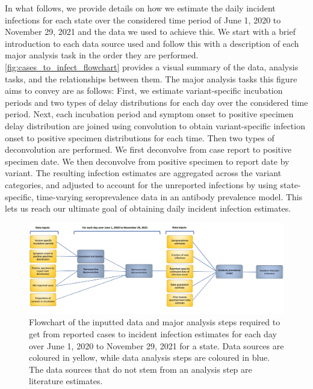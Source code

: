 \documentclass{article}
\begin{document}
In what follows, we provide details on how we estimate the daily incident
infections for each state over the considered time period of June 1, 2020 to
November 29, 2021 and the data we used to achieve this. We start with a brief
introduction to each data source used and follow this with a description of each
major analysis task in the order they are performed.
\autoref{fig:cases_to_infect_flowchart} provides a visual summary of the data,
analysis tasks, and the relationships between them. The major analysis tasks this figure aims to convey are as follows: 
First, we estimate variant-specific incubation periods and two types of delay distributions for each day over the considered time period. Next, each incubation period and symptom onset to positive specimen delay distribution are joined using convolution to obtain variant-specific infection onset to positive specimen distributions for each time. Then two types of deconvolution are performed. We first deconvolve from case report to positive specimen date. We then deconvolve from positive specimen to report date by variant. The resulting infection estimates are aggregated across the variant categories, and adjusted to account for the unreported infections by using state-specific, time-varying seroprevalence data in an antibody prevalence model. This lets us reach our ultimate goal of obtaining daily incident infection estimates.


\begin{figure}[!tb]
\centering
    \includegraphics[width=.99\textwidth]{Reported_cases_to_infect_flowchart.pdf} 
    \caption{Flowchart of the inputted data and major analysis steps required 
    to get from reported cases to incident infection estimates for each day 
    over June 1, 2020 to November 29, 2021 for a state. Data sources are coloured 
    in yellow, while data analysis steps are coloured in blue. The data sources that
    do not stem from an analysis step are literature estimates.}
    \label{fig:cases_to_infect_flowchart}
\end{figure}
\end{document}
